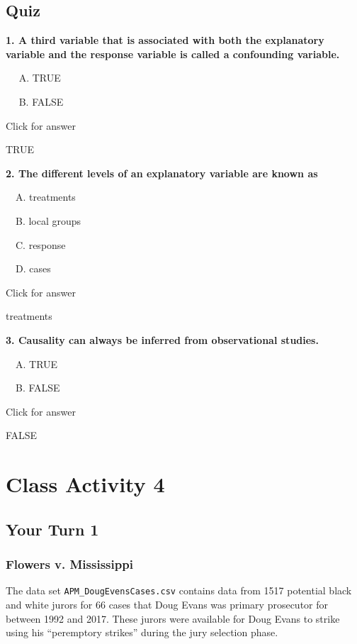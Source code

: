\documentclass[
]{book}
\begin{document}
\hypertarget{quiz-2}{%
\section{Quiz}\label{quiz-2}}

\textbf{1. A third variable that is associated with both the explanatory variable and the response variable is called a confounding variable.}

  A. TRUE

  B. FALSE

Click for answer

TRUE

\textbf{2. The different levels of an explanatory variable are known as }

 A. treatments

 B. local groups

 C. response

 D. cases

Click for answer

treatments

\textbf{3. Causality can always be inferred from observational studies.}

 A. TRUE

 B. FALSE

Click for answer

FALSE

\hypertarget{class-activity-4}{%
\chapter{Class Activity 4}\label{class-activity-4}}

\hypertarget{your-turn-1-2}{%
\section{Your Turn 1}\label{your-turn-1-2}}

\hypertarget{flowers-v.-mississippi}{%
\subsection{Flowers v. Mississippi}\label{flowers-v.-mississippi}}

The data set \texttt{APM\_DougEvensCases.csv} contains data from 1517 potential black and white jurors for 66 cases that Doug Evans was primary prosecutor for between 1992 and 2017. These jurors were available for Doug Evans to strike using his ``peremptory strikes'' during the jury selection phase.
\end{document}
